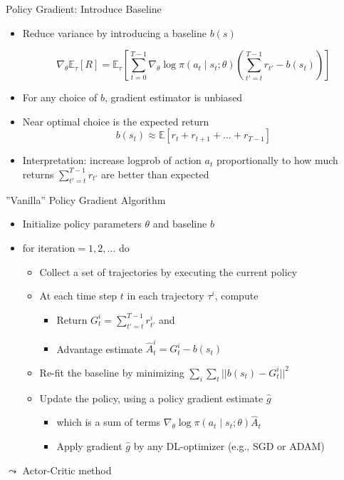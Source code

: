 \documentclass[aspectratio=169]{../latex_main/tntbeamer}  %
\begin{document}
\begin{frame}[c]{Policy Gradient: Introduce Baseline}
	
\begin{itemize}
	\item Reduce variance by introducing a baseline $b(s)$
	
	$$\nabla_\theta \mathbb{E}_\tau [R] = \mathbb{E}_\tau \left[ \sum_{t=0}^{T-1} \nabla_\theta \log \pi(a_t \mid s_t; \theta) \left( \sum_{t'=t}^{T-1} r_{t'} - b(s_t) \right) \right] $$
	
	\item For any choice of $b$, gradient estimator is unbiased
	\item Near optimal choice is the expected return
	$$b(s_t) \approx \mathbb{E} [r_t + r_{t+1} +\ldots + r_{T-1}] $$
	
	\item Interpretation: increase logprob of action $a_t$ proportionally to how much returns $\sum_{t'=t}^{T-1} r_{t'}$ are better than expected
	
\end{itemize}
	
	
\end{frame}
\begin{frame}[c]{”Vanilla” Policy Gradient Algorithm}
	
	\begin{itemize}
		\item Initialize policy parameters $\theta$ and baseline $b$
		\item for iteration$=1,2,\ldots$ do
		\begin{itemize}
			\item Collect a set of trajectories by executing the current policy
			\item At each time step $t$ in each trajectory $\tau^i$, compute
			\begin{itemize}
				\item Return $G_t^i= \sum_{t'=t}^{T-1} r_{t'}^i$ and
				\item Advantage estimate $\hat{A}^i_t = G^i_t - b(s_t)$
			\end{itemize}
			\item Re-fit the baseline by minimizing $\sum_i \sum_t || b(s_t) - G^i_t||^2$
			\item Update the policy, using a policy gradient estimate $\hat{g}$
			\begin{itemize}
				\item which is a sum of terms $\nabla_\theta \log \pi(a_t \mid s_t; \theta) \hat{A}_t$
				\item Apply gradient $\hat{g}$ by any DL-optimizer (e.g., SGD or ADAM)
			\end{itemize}
		\end{itemize}
		
	\end{itemize}

\bigskip

$\leadsto$ Actor-Critic method
 
\end{frame}
\end{document}
